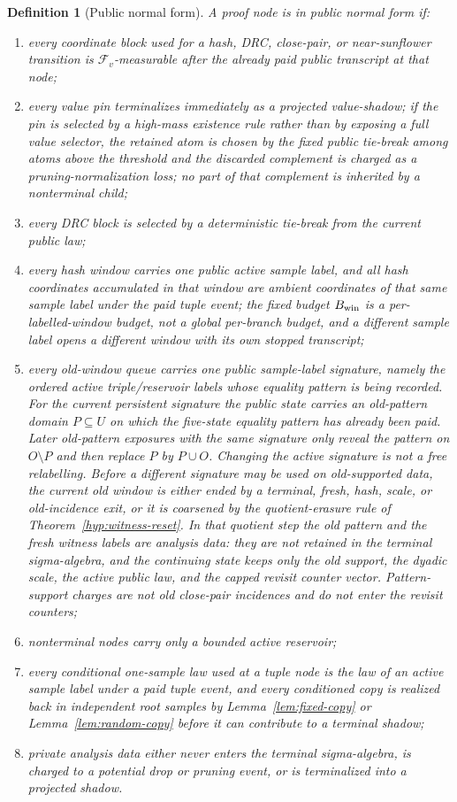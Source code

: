 \documentclass[11pt]{article}
\newtheorem{definition}[theorem]{Definition}
\begin{document}
\begin{definition}[Public normal form]
A proof node is in public normal form if:
\begin{enumerate}[label=\textup{(\roman*)}]
\item every coordinate block used for a hash, DRC, close-pair, or
near-sunflower transition is $\mathcal F_v$-measurable after the already paid
public transcript at that node;
\item every value pin terminalizes immediately as a projected value-shadow;
if the pin is selected by a high-mass existence rule rather than by exposing a
full value selector, the retained atom is chosen by the fixed public tie-break
among atoms above the threshold and the discarded complement is charged as a
pruning-normalization loss; no part of that complement is inherited by a
nonterminal child;
\item every DRC block is selected by a deterministic tie-break from the
current public law;
\item every hash window carries one public active sample label, and all hash
coordinates accumulated in that window are ambient coordinates of that same
sample label under the paid tuple event; the fixed budget $B_{\rm win}$ is a
per-labelled-window budget, not a global per-branch budget, and a different
sample label opens a different window with its own stopped transcript;
\item every old-window queue carries one public sample-label signature, namely
the ordered active triple/reservoir labels whose equality pattern is being
recorded.  For the current persistent signature the public state carries an
old-pattern domain $P\subseteq U$ on which the five-state equality pattern has
already been paid.  Later old-pattern exposures with the same signature only
reveal the pattern on $O\setminus P$ and then replace $P$ by $P\cup O$.
Changing the active signature is not a free relabelling.  Before a different
signature may be used on old-supported data, the current old window is either
ended by a terminal, fresh, hash, scale, or old-incidence exit, or it is
coarsened by the quotient-erasure rule of
Theorem~\ref{hyp:witness-reset}.  In that quotient step the old pattern and
the fresh witness labels are analysis data: they are not retained in the
terminal sigma-algebra, and the continuing state keeps only the old support,
the dyadic scale, the active public law, and the capped revisit counter vector.
Pattern-support charges are not old close-pair incidences and do not enter the
revisit counters;
\item nonterminal nodes carry only a bounded active reservoir;
\item every conditional one-sample law used at a tuple node is the law of an
active sample label under a paid tuple event, and every conditioned copy is
realized back in independent root samples by Lemma~\ref{lem:fixed-copy} or
Lemma~\ref{lem:random-copy} before it can contribute to a terminal shadow;
\item private analysis data either never enters the terminal sigma-algebra, is
charged to a potential drop or pruning event, or is terminalized into a
projected shadow.
\end{enumerate}
\end{definition}
\end{document}
